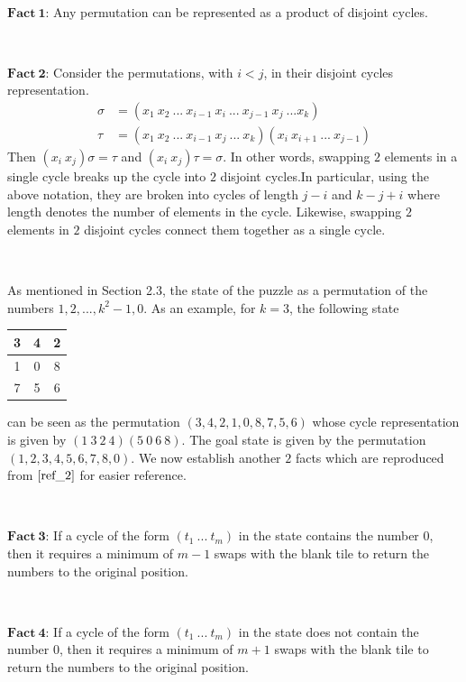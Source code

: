 \documentclass[runningheads]{llncs}
\begin{document}
\

$\mathbf{Fact \ 1}$: Any permutation can be represented as a product of disjoint cycles.

\

$\mathbf{Fact \ 2}$: Consider the permutations, with $i < j$, in their disjoint cycles representation.
\begin{align*}
\sigma &= (x_1 \ x_2 \ ... \ x_{i - 1} \ x_{i} \ ... \ x_{j - 1} \ x_{j} \ ... x_{k}) \\
\tau &= (x_1 \ x_2 \ ... \ x_{i - 1} \ x_{j} \ ... \ x_{k})(x_{i} \ x_{i + 1} \ ... \ x_{j - 1})
\end{align*}
Then $(x_{i} \ x_{j})\sigma = \tau$ and $(x_{i} \ x_{j})\tau = \sigma$. In other words, swapping $2$ elements in a single cycle breaks up the cycle into $2$ disjoint cycles.In particular, using the above notation, they are broken into cycles of length $j - i$ and $k - j + i$ where length denotes the number of elements in the cycle. Likewise, swapping $2$ elements in $2$ disjoint cycles connect them together as a single cycle.

\

 As mentioned in Section 2.3, the state of the puzzle as a permutation of the numbers $1, 2, ..., k^{2} - 1, 0$. As an example, for $k = 3$, the following state
\begin{center}
    \begin{tabular}{|c|c|c|}
    \hline
    3 & 4 & 2 \\
    \hline
    1 & 0 & 8 \\
    \hline
    7 & 5 & 6 \\
    \hline
    \end{tabular}
\end{center}
can be seen as the permutation $(3, 4, 2, 1, 0, 8, 7, 5, 6)$ whose cycle representation is given by $(1 \ 3 \ 2 \ 4)(5 \ 0 \ 6 \ 8)$. The goal state is given by the permutation $(1, 2, 3, 4, 5, 6, 7, 8, 0)$. We now establish another $2$ facts which are reproduced from $\cite{ref_2}$ for easier reference.

\

$\mathbf{Fact \ 3}$: If a cycle of the form $(t_{1} \ ... \ t_{m})$ in the state contains the number $0$, then it requires a minimum of $m - 1$ swaps with the blank tile to return the numbers to the original position.
    
\

$\mathbf{Fact \ 4}$: If a cycle of the form $(t_{1} \ ... \ t_{m})$ in the state does not contain the number $0$, then it requires a minimum of $m + 1$ swaps with the blank tile to return the numbers to the original position.
\end{document}
